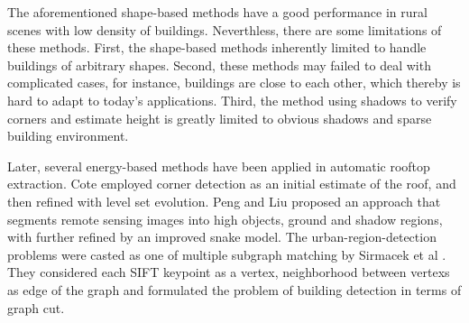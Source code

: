 The aforementioned shape-based methods have a good performance in rural scenes with low density of buildings. Neverthless, there are some limitations of these methods. 
First, the shape-based methods inherently limited to handle buildings of arbitrary shapes. 
Second, these methods may failed to deal with complicated cases, for instance, buildings are close to each other, which thereby is hard to adapt to today's applications. Third, the method using shadows to verify corners and estimate height is greatly limited to obvious shadows and sparse building environment. 


Later, several energy-based methods have been applied in automatic rooftop extraction. Cote \cite{IEEEexample:cote2013automatic} employed corner detection as an initial estimate of the roof, and then refined with level set evolution. Peng and Liu \cite{IEEEexample:peng2005improved} proposed an approach that segments remote sensing images into high objects, ground and shadow regions, with further refined by an improved snake model. The urban-region-detection problems were casted as one of multiple subgraph matching by Sirmacek et al \cite{IEEEexample:sirmacek2009urban}. They considered each SIFT keypoint as a vertex, neighborhood between vertexs as edge of the graph and formulated the problem of building detection in terms of graph cut.


